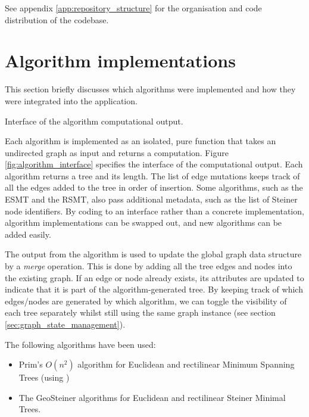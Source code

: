 \documentclass{l4proj}
\begin{document}
See appendix \ref{app:repository_structure} for the organisation and code distribution of the codebase.

\section{Algorithm implementations}
\label{sec:algorithm_implementations}
This section briefly discusses which algorithms were implemented and how they were integrated into the application.
\begin{wrapstuff}[r,width=0.3\textwidth,type=figure]
    \centering
    \caption{Interface of the algorithm computational output.}
    
    \label{fig:algorithm_interface}
\end{wrapstuff}
Each algorithm is implemented as an isolated, pure function that takes an undirected graph as input and returns a computation.
Figure \ref{fig:algorithm_interface} specifies the interface of the computational output. Each algorithm returns a tree and its length. The list of edge mutations keeps track of all the edges added to the tree in order of insertion. Some algorithms, such as the ESMT and the RSMT, also pass additional metadata, such as the list of Steiner node identifiers.
By coding to an interface rather than a concrete implementation, algorithm implementations can be swapped out, and new algorithms can be added easily.

The output from the algorithm is used to update the global graph data structure by a \textit{merge} operation. This is done by adding all the tree edges and nodes into the existing graph. If an edge or node already exists, its attributes are updated to indicate that it is part of the algorithm-generated tree. By keeping track of which edges/nodes are generated by which algorithm, we can toggle the visibility of each tree separately whilst still using the same graph instance (see section \ref{sec:graph_state_management}).

\wrapstuffclear

The following algorithms have been used:
\begin{itemize}
    \item Prim's $O(n^2)$ algorithm for Euclidean and rectilinear Minimum Spanning Trees (using \citep[pp. 194--195]{Skiena2008})
    \item The GeoSteiner algorithms for Euclidean and rectilinear Steiner Minimal Trees.
\end{itemize}
\end{document}
